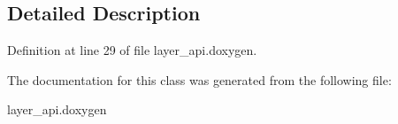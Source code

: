 \subsection{Detailed Description}


Definition at line 29 of file layer\-\_\-api.\-doxygen.



The documentation for this class was generated from the following file\-:\begin{DoxyCompactItemize}
\item 
layer\-\_\-api.\-doxygen\end{DoxyCompactItemize}
